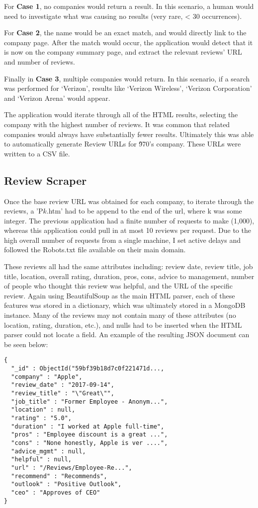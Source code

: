 \documentclass[conference, letterpaper]{IEEEtran}
\begin{document}
For \textbf{Case 1}, no companies would return a result.
In this scenario, a human would need to investigate what was causing no results (very rare, < 30 occurrences).

For \textbf{Case 2}, the name would be an exact match, and would directly link to the company page.
After the match would occur, the application would detect that it is now on the company summary page, and extract the relevant reviews' URL and number of reviews.

Finally in \textbf{Case 3}, multiple companies would return. 
In this scenario, if a search was performed for `Verizon', results like `Verizon Wireless', `Verizon Corporation' and  `Verizon Arena' would appear.

The application would iterate through all of the HTML results, selecting the company with the highest number of reviews.
It was common that related companies would always have substantially fewer results.
Ultimately this was able to automatically generate Review URLs for \~970's company.
These URLs were written to a CSV file.\\

\subsection{Review Scraper}
Once the base review URL was obtained for each company, to iterate through the reviews, a 'P$k$.htm' had to be append to the end of the url, where k was some integer.
The previous application had a finite number of requests to make (1,000), whereas this application could pull in at most 10 reviews per request.
Due to the high overall number of requests from a single machine, I set active delays and followed the Robots.txt file available on their main domain.

These reviews all had the same attributes including: review date, review title, job title, location, overall rating, duration, pros, cons, advice to management, number of people who thought this review was helpful, and the URL of the specific review.
Again using BeautifulSoup as the main HTML parser, each of these features was stored in a dictionary, which was ultimately stored in a MongoDB instance. 
Many of the reviews may not contain many of these attributes (no location, rating, duration, etc.), and nulls had to be inserted when the HTML parser could not locate a field.
An example of the resulting JSON document can be seen below:


\begin{lstlisting}
{
  "_id" : ObjectId("59bf39b18d7c0f221471d...,
  "company" : "Apple",
  "review_date" : "2017-09-14",
  "review_title" : "\"Great\"",
  "job_title" : "Former Employee - Anonym...",
  "location" : null,
  "rating" : "5.0",
  "duration" : "I worked at Apple full-time",
  "pros" : "Employee discount is a great ...",
  "cons" : "None honestly, Apple is ver ....",
  "advice_mgmt" : null,
  "helpful" : null,
  "url" : "/Reviews/Employee-Re...",
  "recommend" : "Recommends",
  "outlook" : "Positive Outlook",
  "ceo" : "Approves of CEO"
}
\end{lstlisting}
\end{document}
